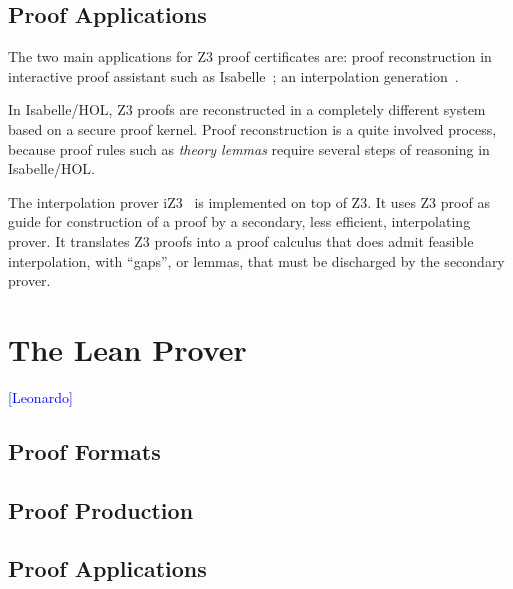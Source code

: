 \documentclass{llncs}
\newcommand{\Note}[1]{\textcolor{blue}{[#1]}}
\begin{document}
\subsection{Proof Applications}

The two main applications for Z3 proof certificates are: proof
reconstruction in interactive proof assistant such as
Isabelle~\cite{IsabelleZ3}; an interpolation generation~\cite{iZ3}.

In Isabelle/HOL, Z3 proofs are reconstructed in a completely different
system based on a secure proof kernel. Proof reconstruction is a quite
involved process, because proof rules such as \emph{theory lemmas} require
several steps of reasoning in Isabelle/HOL.

The interpolation prover iZ3~\cite{iZ3} is implemented on top of Z3.  It uses Z3
proof as guide for construction of a proof by a secondary, less
efficient, interpolating prover. It translates Z3 proofs into
a proof calculus that does admit feasible interpolation, with
``gaps'', or lemmas, that must be discharged by the secondary prover.


\section{The Lean Prover}
\Note{Leonardo}
\subsection{Proof Formats}
\subsection{Proof Production}
\subsection{Proof Applications}





\end{document}
